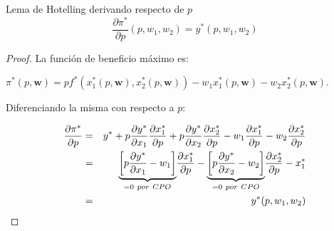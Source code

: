 \documentclass{beamer}
\theoremstyle{definition}
\begin{document}
\begin{frame}[noframenumbering]{Lema de Hotelling derivando respecto de $p$}\small
\[\frac{\partial \pi^*}{\partial p}(p,w_{1},w_{2})=y^*(p,w_{1},w_{2})\]
\begin{proof}
La funci\'{o}n de beneficio m\'{a}ximo es: 
\begin{center}
$\pi ^{\ast
}(p,\textbf{w})=pf^{\ast }\left( x_{1}^{\ast }(p,\textbf{w}),x_{2}^{\ast
}(p,\textbf{w})\right)-w_{1}x_{1}^{\ast }(p,\textbf{w})-w_{2}x_{2}^{\ast
}(p,\textbf{w})$. 
\end{center}
Diferenciando la misma con respecto a $p$:

\begin{eqnarray*}
\frac{\partial \pi ^{\ast }}{\partial p} &=& y^* +p\frac{\partial y^{\ast }}{%
\partial x_{1}}\frac{\partial x_{1}^{\ast }}{\partial p}+p\frac{\partial
y^{\ast }}{\partial x_{2}}\frac{\partial x_{2}^{\ast }}{\partial p}-w_{1}%
\frac{\partial x_{1}^{\ast }}{\partial p}-w_{2}\frac{\partial x_{2}^{\ast }}{\partial p} \\
&=&\underset{=0 \ por \ CPO}{\underbrace{\left[ p\frac{\partial y^{\ast }}{\partial x_{1}%
}-w_{1}\right] }}\frac{\partial x_{1}^{\ast }}{\partial p}-\underset{=0 \ por \ CPO}{%
\underbrace{\left[ p\frac{\partial y^{\ast }}{\partial x_{2}}-w_{2}\right] }}\frac{\partial x_{2}^{\ast }}{\partial p}%
-x_{1}^{\ast } \\
&=&y^{\ast }(p,w_{1},w_{2})
\end{eqnarray*}
\end{proof}
\end{frame}
\end{document}
